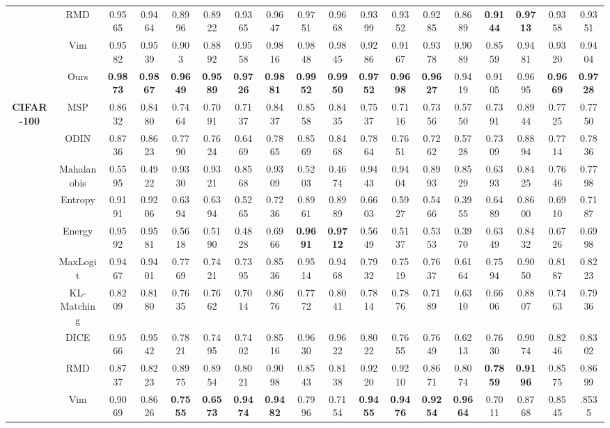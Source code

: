 \documentclass[letterpaper]{article} %
\begin{document}
\begin{table}[!ht]
\begin{adjustbox}{width=17.8cm,center}
\begin{tabular}{c|c|cccccccccccccc|cc}
 & RMD  &0.9565	&0.9464	&0.8996	&0.8922	&0.9365	&0.9647	&0.9751	&0.9668	&0.9399	&0.9352	&0.9285	&0.8689&\textbf{0.9144}&\textbf{0.9713}&0.9358	&0.9351\\
 & Vim &0.9582	&0.9539	&0.903	&0.8892	&0.9558	&0.9816	&0.9848	&0.9845	&0.9286	&0.9167	&0.9378&0.9089&0.8559	&0.9481	&0.9320	&0.9404\\
  \cline{2-18}
 & Ours   &\textbf{0.9873}&\textbf{0.9867}&\textbf{0.9649}&\textbf{0.9589}&\textbf{0.9726}&\textbf{0.9881}&\textbf{0.9952}&\textbf{0.9950}&\textbf{0.9752}&\textbf{0.9698}&\textbf{0.9627}	&0.9419&0.9105	&0.9695	&\textbf{0.9669}&\textbf{0.9728}\\ 
\hline
 \multirow{12}{*}{\textbf{CIFAR-100}} 
 & MSP  &0.8632	&0.8480	&0.7464	&0.7091	&0.7137 &0.8437&0.8558 &0.8435&0.7537&0.7116	&0.7356	&0.5750&0.7391	&0.8944	&0.7725	&0.7750\\
 & ODIN  &0.8736	&0.8623	&0.7790	&0.7624	&0.6469	&0.7865	&0.8569	&0.8468	&0.7864	&0.7651	&0.7262	&0.5728&0.7309	&0.8894	&0.7714	&0.7836\\
 & Mahalanobis &0.5595	&0.4922	&0.9330	&0.9321	&0.8568	&0.9309	&0.5203	&0.4674	&0.9443	&0.9404	&0.8993	&0.8529	&0.6393	&0.8425	&0.7646	&0.7798\\
 & Entropy  &0.9191	&0.9206	&0.6394	&0.6394	&0.5265	&0.7236	&0.8961	&0.8989	&0.6603	&0.5927	&0.5466	&0.3955&0.6489	&0.8600	&0.6910	&0.7187\\
 & Energy &0.9592 &0.9581 &0.5618 &0.5190&0.4828 &0.6966 &\textbf{0.9691} &\textbf{0.9712} &0.5649 &0.5137	&0.5353	&0.3970 &0.6349 &0.8432 &0.6726 &0.6998\\
 & MaxLogit  &0.9467	&0.9401	&0.7769	&0.7421	&0.7395	&0.8536	&0.9514	&0.9468	&0.7932	&0.7519	&0.7637	&0.6164&0.7594	&0.9050	&0.8187	&0.8223\\
 & KL-Matching  &0.8209	&0.8180	&0.7635	&0.7662	&0.7014	&0.8676	&0.7772	&0.8041	&0.7814&0.7876	&0.7189	&0.6310&0.6606	&0.8807	&0.7463	&0.7936\\
 & DICE  &0.9566	&0.9542	&0.7821	&0.7495	&0.7402	&0.8516	&0.9630	&0.9622	&0.8022	&0.7655	&0.7649	&0.6213&0.7630	&0.9074	&0.8246	&0.8302\\
 & RMD  &0.8737	&0.8223	&0.8975	&0.8954	&0.8021	&0.9098	&0.8543	&0.8138&0.9220	&0.9210	&0.8671	&0.8074&\textbf{0.7859}&\textbf{0.9196}&0.8575	&0.8699\\
 & Vim &0.9069&0.8626&\textbf{0.7555}&\textbf{0.6573}&\textbf{0.9474}&\textbf{0.9482}&0.7996	&0.7154	&\textbf{0.9455}&\textbf{0.9476}&\textbf{0.9254}&\textbf{0.9664}&0.7011	&0.8768	&0.8545	&.8535\\

\end{tabular}
\end{adjustbox}
\end{table}
\end{document}
